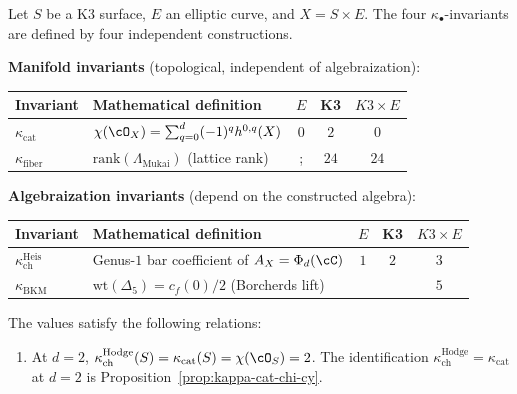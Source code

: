 \begin{proposition}
\label{prop:kappa-spectrum-reconciliation}
Let $S$ be a K3 surface, $E$ an elliptic curve, and $X = S \times E$. The four $\kappa_\bullet$-invariants are defined by four independent constructions.

\medskip\noindent\textbf{Manifold invariants} (topological, independent of algebraization):
\begin{center}
\renewcommand{\arraystretch}{1.35}
\begin{tabular}{llccc}
 \toprule
 \textbf{Invariant} & \textbf{Mathematical definition} & \textbf{$E$} & \textbf{K3} & \textbf{$K3 \times E$} \\
 \midrule
 $\kappa_{\mathrm{cat}}$ & $\chi(\cO_X) = \sum_{q=0}^{d}(-1)^q h^{0,q}(X)$ & $0$ & $2$ & $0$ \\[3pt]
 $\kappa_{\mathrm{fiber}}$ & $\mathrm{rank}(\Lambda_{\mathrm{Mukai}})$ (lattice rank) &; & $24$ & $24$ \\
 \bottomrule
\end{tabular}
\end{center}

\noindent\textbf{Algebraization invariants} (depend on the constructed algebra):
\begin{center}
\renewcommand{\arraystretch}{1.35}
\begin{tabular}{llccc}
 \toprule
 \textbf{Invariant} & \textbf{Mathematical definition} & \textbf{$E$} & \textbf{K3} & \textbf{$K3 \times E$} \\
 \midrule
 $\kappa_{\mathrm{ch}}^{\mathrm{Heis}}$ & Genus-$1$ bar coefficient of $A_X = \Phi_d(\cC)$ & $1$ & $2$ & $3$ \\[3pt]
 $\kappa_{\mathrm{BKM}}$ & $\mathrm{wt}(\Delta_5) = c_f(0)/2$ (Borcherds lift) & & & $5$ \\
 \bottomrule
\end{tabular}
\end{center}

\noindent
The values satisfy the following relations:
\begin{enumerate}[label=\textup{(\roman*)}]
 \item At \(d=2\), \(\kappa_{\mathrm{ch}}^{\mathrm{Hodge}}(S)=\kappa_{\mathrm{cat}}(S)=\chi(\cO_S)=2\).
 The identification \(\kappa_{\mathrm{ch}}^{\mathrm{Hodge}}=\kappa_{\mathrm{cat}}\) at \(d=2\) is Proposition~\textup{\ref{prop:kappa-cat-chi-cy}}.


\end{enumerate}
\end{proposition}
